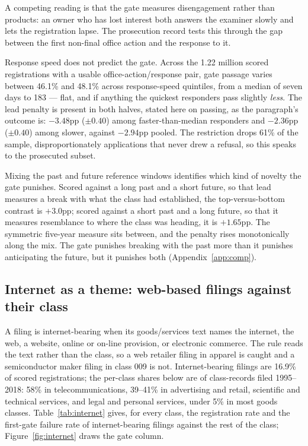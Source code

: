 A competing reading is that the gate measures disengagement rather than
products: an owner who has lost interest both answers the examiner slowly
and lets the registration lapse. The prosecution record tests this through
the gap between the first non-final office action and the response to it.

Response speed does not predict the gate. Across the 1.22 million scored
registrations with a usable office-action/response pair, gate passage varies
between 46.1\% and 48.1\% across response-speed quintiles, from a median of
seven days to 183 --- flat, and if anything the quickest responders pass
slightly \emph{less}. The lead penalty is present in both halves, stated
here on passing, as the paragraph's outcome is: $-3.48$pp
($\pm 0.40$) among faster-than-median responders and $-2.36$pp ($\pm 0.40$)
among slower, against $-2.94$pp pooled. The restriction drops 61\% of
the sample, disproportionately applications that never drew a refusal, so
this speaks to the prosecuted subset.

Mixing the past and future reference windows identifies which kind of
novelty the gate punishes. Scored against a long past and a short future,
so that lead measures a break with what the class had established, the
top-versus-bottom contrast is $+3.0$pp; scored against a short past and a
long future, so that it measures resemblance to where the class was
heading, it is $+1.65$pp. The symmetric five-year measure sits between, and
the penalty rises monotonically along the mix. The gate punishes breaking
with the past more than it punishes anticipating the future, but it
punishes both (Appendix~\ref{app:comp}).

\subsection{Internet as a theme: web-based filings against their class}\label{sec:internet}

A filing is internet-bearing when its goods/services text names the
internet, the web, a website, online or on-line provision, or electronic
commerce. The rule reads the text rather than the class, so a web retailer
filing in apparel is caught and a semiconductor maker filing in class 009 is
not. Internet-bearing filings are 16.9\% of scored registrations; the
per-class shares below are of class-records filed 1995--2018:
58\% in telecommunications, 39--41\% in advertising and retail, scientific
and technical services, and legal and personal services, under 5\% in most
goods classes. Table~\ref{tab:internet} gives, for every class, the
registration rate and the first-gate failure rate of internet-bearing
filings against the rest of the class; Figure~\ref{fig:internet} draws the
gate column.

